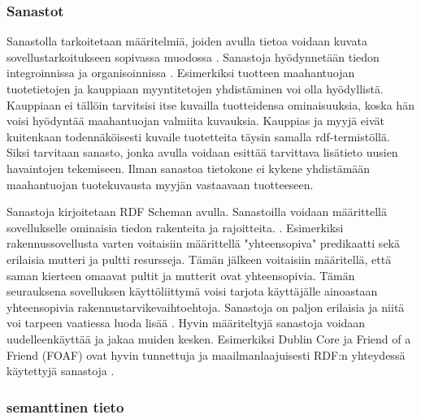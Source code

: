 \documentclass[finnish, 12pt, a4paper, elec, utf8, pdfa, online]{aaltothesis}
\begin{document}
\begin{figure}[htb]
\centering


\end{figure}
\subsubsection{Sanastot}
Sanastolla tarkoitetaan määritelmiä, joiden avulla tietoa voidaan kuvata sovellustarkoitukseen sopivassa muodossa \cite{RDF_specification}. Sanastoja hyödynnetään tiedon integroinnissa ja organisoinnissa \cite{vocabulary}. Esimerkiksi tuotteen maahantuojan tuotetietojen ja kauppiaan myyntitetojen yhdistäminen voi olla hyödyllistä. Kauppiaan ei tällöin tarvitsisi itse kuvailla tuotteidensa ominaisuuksia, koska hän voisi hyödyntää maahantuojan valmiita kuvauksia. Kauppias ja myyjä eivät kuitenkaan todennäköisesti kuvaile tuotetteita täysin samalla rdf-termistöllä. Siksi tarvitaan sanasto, jonka avulla voidaan esittää tarvittava lisätieto uusien havaintojen tekemiseen. Ilman sanastoa tietokone ei kykene yhdistämään maahantuojan tuotekuvausta myyjän vastaavaan tuotteeseen.

Sanastoja kirjoitetaan RDF Scheman avulla. Sanastoilla voidaan määrittellä sovellukselle ominaisia tiedon rakenteita ja rajoitteita. \cite{vocabulary}. Esimerkiksi rakennussovellusta varten voitaisiin määrittellä "yhteensopiva" predikaatti sekä erilaisia mutteri ja pultti resursseja. Tämän jälkeen voitaisiin määritellä, että saman kierteen omaavat pultit ja mutterit ovat yhteensopivia. Tämän seurauksena sovelluksen käyttöliittymä voisi tarjota käyttäjälle ainoastaan yhteensopivia rakennustarvikevaihtoehtoja. Sanastoja on paljon erilaisia ja niitä voi tarpeen vaatiessa luoda lisää \cite{RDF_specification}. Hyvin määriteltyjä sanastoja voidaan uudelleenkäyttää ja jakaa muiden kesken. Esimerkiksi Dublin Core ja Friend of a Friend (FOAF) ovat hyvin tunnettuja ja maailmanlaajuisesti RDF:n yhteydessä käytettyjä sanastoja \cite{data_namespace}.


\subsubsection{semanttinen tieto}
\end{document}
